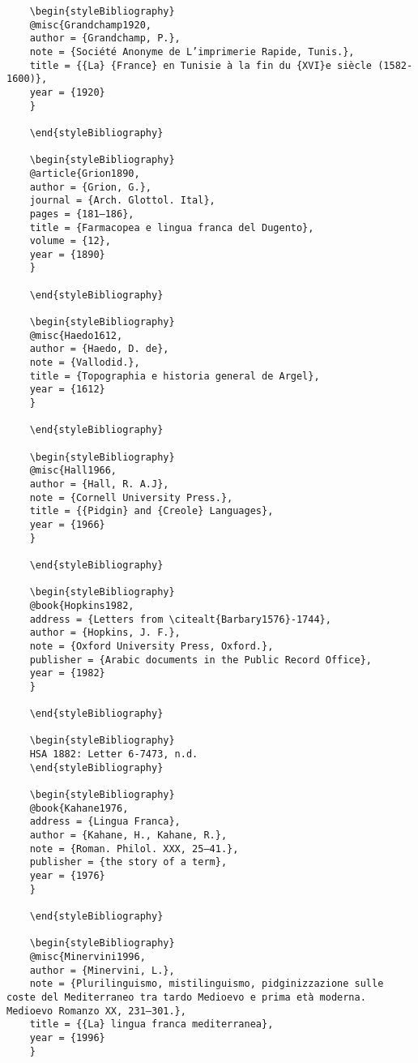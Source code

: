 \documentclass[output=paper]{langsci/langscibook}
\begin{document}
\begin{stylelsUnNumberedSection}
\begin{verbatim}
	\begin{styleBibliography}
	@misc{Grandchamp1920,
	author = {Grandchamp, P.},
	note = {Société Anonyme de L’imprimerie Rapide, Tunis.},
	title = {{La} {France} en Tunisie à la fin du {XVI}e siècle (1582-1600)},
	year = {1920}
	}
	
	\end{styleBibliography}
	
	\begin{styleBibliography}
	@article{Grion1890,
	author = {Grion, G.},
	journal = {Arch. Glottol. Ital},
	pages = {181–186},
	title = {Farmacopea e lingua franca del Dugento},
	volume = {12},
	year = {1890}
	}
	
	\end{styleBibliography}
	
	\begin{styleBibliography}
	@misc{Haedo1612,
	author = {Haedo, D. de},
	note = {Vallodid.},
	title = {Topographia e historia general de Argel},
	year = {1612}
	}
	
	\end{styleBibliography}
	
	\begin{styleBibliography}
	@misc{Hall1966,
	author = {Hall, R. A.J},
	note = {Cornell University Press.},
	title = {{Pidgin} and {Creole} Languages},
	year = {1966}
	}
	
	\end{styleBibliography}
	
	\begin{styleBibliography}
	@book{Hopkins1982,
	address = {Letters from \citealt{Barbary1576}-1744},
	author = {Hopkins, J. F.},
	note = {Oxford University Press, Oxford.},
	publisher = {Arabic documents in the Public Record Office},
	year = {1982}
	}
	
	\end{styleBibliography}
	
	\begin{styleBibliography}
	HSA 1882: Letter 6-7473, n.d.
	\end{styleBibliography}
	
	\begin{styleBibliography}
	@book{Kahane1976,
	address = {Lingua Franca},
	author = {Kahane, H., Kahane, R.},
	note = {Roman. Philol. XXX, 25–41.},
	publisher = {the story of a term},
	year = {1976}
	}
	
	\end{styleBibliography}
	
	\begin{styleBibliography}
	@misc{Minervini1996,
	author = {Minervini, L.},
	note = {Plurilinguismo, mistilinguismo, pidginizzazione sulle coste del Mediterraneo tra tardo Medioevo e prima età moderna. Medioevo Romanzo XX, 231–301.},
	title = {{La} lingua franca mediterranea},
	year = {1996}
	}
	

\end{verbatim}
\end{stylelsUnNumberedSection}
\end{document}
